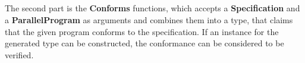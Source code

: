 \begin{code}
    \>[2]\AgdaSpace{}%
    \AgdaSpace{}%
    \AgdaSymbol{:}\AgdaSpace{}%
    \AgdaSpace{}%
    \<%
    \\
    \>[2][@{}l@{\AgdaIndent{0}}]%
    \>[4]\AgdaSpace{}%
    \<%
    \\
    \>[4]\<%
    \\
    \>[4][@{}l@{\AgdaIndent{0}}]%
    \>[6]\AgdaSpace{}%
    \AgdaSymbol{:}\AgdaSpace{}%
    \AgdaSpace{}%
    \AgdaSymbol{(}\AgdaSpace{}%
    \AgdaSpace{}%
    \AgdaSymbol{)}\<%
    \\
    \>[6]\AgdaSpace{}%
    \AgdaSymbol{:}\AgdaSpace{}%
    \AgdaSpace{}%
    \AgdaSymbol{(}\AgdaSpace{}%
    \AgdaSpace{}%
    \AgdaSymbol{)}\<%
    \\
    \>[6]\AgdaSpace{}%
    \AgdaSymbol{:}\AgdaSpace{}%
    \AgdaSpace{}%
    \AgdaSymbol{(}\AgdaSpace{}%
    \AgdaSpace{}%
    \AgdaSymbol{)}\<%
    \\
    \>[6]\AgdaSpace{}%
    \AgdaSymbol{:}\AgdaSpace{}%
    \AgdaSpace{}%
    \<%
    \\
    \>[6]\AgdaSpace{}%
    \AgdaSymbol{:}\AgdaSpace{}%
    \AgdaSpace{}%
    \<%
    \\
    \>[6]\AgdaSpace{}%
    \AgdaSymbol{:}\AgdaSpace{}%
    \AgdaSpace{}%
    \<%
    \\
    \>[6]\AgdaSpace{}%
    \AgdaSymbol{:}\AgdaSpace{}%
    \AgdaSpace{}%
    \<%
\end{code}

The second part is the \textbf{Conforms} functions, which accepts a \textbf{Specification} and a \textbf{ParallelProgram} as arguments and combines them into a type, that claims that the given program conforms to the specification. If an instance for the generated type can be constructed, the conformance can be considered to be verified.

